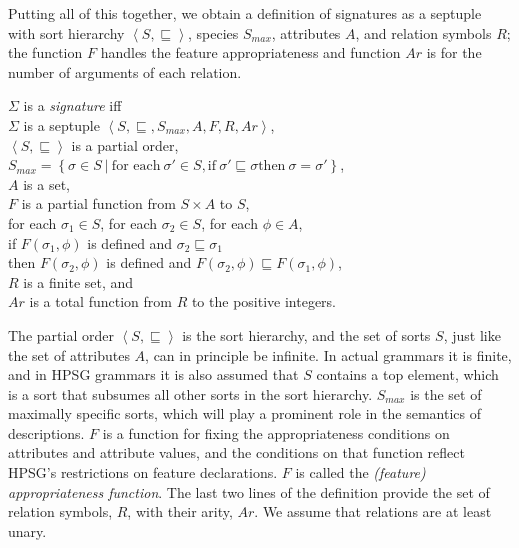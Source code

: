 \documentclass[output=paper
 	        ,biblatex
                ,babelshorthands
                ,newtxmath
                ,draftmode
                ,colorlinks, citecolor=brown
]{langscibook}
\begin{document}
{Putting all of this together, we obtain a definition of signatures
as a septuple with sort hierarchy $\left<S,\sqsubseteq\right>$, species
$S_{max}$, attributes $A$, and relation symbols $R$; the function $F$ handles
the feature appropriateness and function $Ar$ is for the number of arguments
of each relation.

\begin{mydef}\label{def-signature}
  $\Sigma$ is a \emph{signature} iff\\
  $\Sigma$ is a septuple $\left<S,\sqsubseteq,S_{max},A,F,R,Ar\right>$,\\
  $\left<S,\sqsubseteq\right>$ is a partial order,\\
  $S_{max} = \left\{\sigma\in S\ |\ \mbox{for each}\ \sigma' \in S, \mbox{if}\ \sigma'\sqsubseteq\sigma \mbox{then}\ \sigma=\sigma'\right\}$,\\
  $A$ is a set,\\
  $F$ is a partial function from $S\times A$ to $S$,\\
  for each $\sigma_1\in S$, for each $\sigma_2\in S$, for each $\phi\in A$,\\
  \hspace*{.5cm} if $F(\sigma_1,\phi)$ is defined and $\sigma_2\sqsubseteq\sigma_1$\\
  \hspace*{.5cm} then $F(\sigma_2,\phi)$ is defined and
             $F(\sigma_2,\phi)\sqsubseteq F(\sigma_1,\phi)$,\\
  $R$ is a finite set, and\\
  $Ar$ is a total function from $R$ to the positive integers.
\end{mydef}

The partial order $\left<S,\sqsubseteq\right>$ is the sort hierarchy,
and the set of sorts $S$, just like the set of attributes $A$, can in principle
be infinite. In actual grammars it is finite, and in HPSG grammars it is
also assumed that $S$ contains a top element, which is a sort that subsumes
all other sorts in the sort hierarchy. $S_{max}$ is the set of maximally
specific sorts, which will play a prominent role in the semantics of
descriptions. $F$ is a function for fixing the appropriateness conditions
on attributes and attribute values, and the conditions on that function
reflect HPSG's restrictions on feature declarations. $F$ is called the
\emph{(feature) appropriateness function}. The last two lines of
the definition provide the set of relation symbols, $R$, with their arity, $Ar$.
We assume that relations are at least unary.

}
\end{document}
